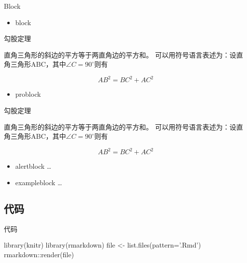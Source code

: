 \documentclass[10pt,ignorenonframetext,aspectratio=169,t,]{beamer} %
\newenvironment{Shaded}{\begin{snugshade}}{\end{snugshade}}
\newcommand{\KeywordTok}[1]{\textcolor[rgb]{0.94,0.87,0.69}{{#1}}}
\newcommand{\DataTypeTok}[1]{\textcolor[rgb]{0.87,0.87,0.75}{{#1}}}
\newcommand{\StringTok}[1]{\textcolor[rgb]{0.80,0.58,0.58}{{#1}}}
\newcommand{\NormalTok}[1]{\textcolor[rgb]{0.80,0.80,0.80}{{#1}}}
\providecommand{\tightlist}{%
  \setlength{\itemsep}{0pt}\setlength{\parskip}{0pt}}
\begin{document}
\begin{frame}{Block}

\begin{itemize}
\tightlist
\item
  block
\end{itemize}

\begin{block}{勾股定理}
  
        直角三角形的斜边的平方等于两直角边的平方和。
可以用符号语言表述为：设直角三角形ABC，其中$\angle C=90^\circ$则有

$$AB^2=BC^2+AC^2$$

\end{block}

\begin{itemize}
\tightlist
\item
  problock
\end{itemize}

\begin{problock}{勾股定理}
  
        直角三角形的斜边的平方等于两直角边的平方和。
可以用符号语言表述为：设直角三角形ABC，其中$\angle C=90^\circ$则有

$$AB^2=BC^2+AC^2$$

\end{problock}

\begin{itemize}
\tightlist
\item
  alertblock \ldots{}
\item
  exampleblock \ldots{}
\end{itemize}

\end{frame}

\subsection{代码}

\begin{frame}[fragile]{代码}

\begin{Shaded}
\begin{Highlighting}[]
\KeywordTok{library}\NormalTok{(knitr)}
\KeywordTok{library}\NormalTok{(rmarkdown)}
\NormalTok{file <-}\StringTok{ }\KeywordTok{list.files}\NormalTok{(}\DataTypeTok{pattern=}\StringTok{'.Rmd'}\NormalTok{)}
\NormalTok{rmarkdown::}\KeywordTok{render}\NormalTok{(file)}
\end{Highlighting}
\end{Shaded}

\end{frame}
\end{document}

